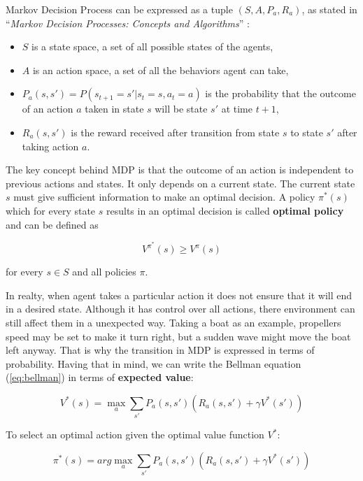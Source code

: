 Markov Decision Process can be expressed as a tuple $(S, A, P_a, R_a)$, as stated in ``\emph{Markov Decision Processes: Concepts and Algorithms}'' \cite{Otterlo2012MarkovDP}:

\begin{itemize}
    \item $S$ is a state space, a set of all possible states of the agents,
    \item $A$ is an action space, a set of all the behaviors agent can take,
    \item $P_a(s, s') = P(s_{t+1} = s' | s_t = s, a_t = a)$ is the probability that the outcome of an action $a$ taken in state $s$ will be state $s'$ at time $t+1$,
    \item $R_a(s, s')$ is the reward received after transition from state $s$ to state $s'$ after taking action $a$.
\end{itemize}

The key concept behind MDP is that the outcome of an action is independent to previous actions and states. It only depends on a current state. The current state $s$ must give sufficient information to make an optimal decision. A policy $\pi^{*}(s)$ which for every state $s$ results in an optimal decision is called \textbf{optimal policy} and can be defined as 

\begin{equation}
    V^{\pi^{*}}(s) \ge V^{\pi}(s)
\end{equation}

for every $s \in S$ and all policies $\pi$.

In realty, when agent takes a particular action it does not ensure that it will end in a desired state. Although it has control over all actions, there environment can still affect them in a unexpected way. Taking a boat as an example, propellers speed may be set to make it turn right, but a sudden wave might move the boat left anyway. That is why the transition in MDP is expressed in terms of probability. Having that in mind, we can write the Bellman equation (\ref{eq:bellman}) in terms of \textbf{expected value}:

\begin{equation}
    V^{*}(s) = \max_a \sum_{s'} P_a(s, s') \left(R_a(s, s') + \gamma V^{*}(s') \right)
\label{eq:state-value}
\end{equation}

To select an optimal action given the optimal value function $V^{*}$:

\begin{equation}
    \pi^{*}(s) = arg \max_a \sum_{s'} P_a(s, s') \left(R_a(s, s') + \gamma V^{*}(s') \right)
\label{eq:state-value-policy}
\end{equation}

